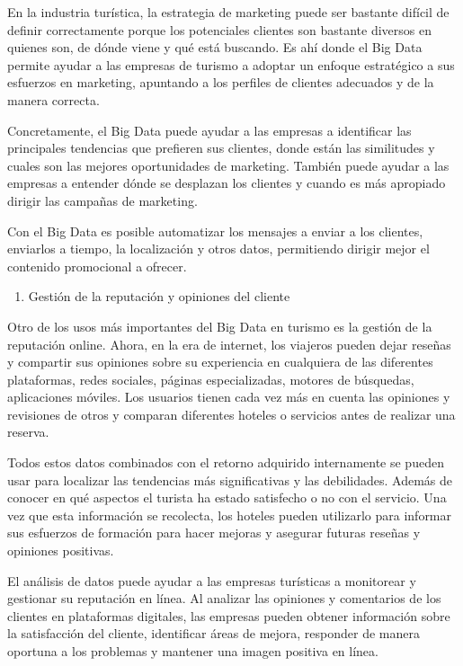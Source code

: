 \documentclass[
  letterpaper,
  DIV=11,
  numbers=noendperiod]{scrreprt}
\providecommand{\tightlist}{%
  \setlength{\itemsep}{0pt}\setlength{\parskip}{0pt}}\usepackage{longtable,booktabs,array}
\begin{document}
En la industria turística, la estrategia de marketing puede ser bastante
difícil de definir correctamente porque los potenciales clientes son
bastante diversos en quienes son, de dónde viene y qué está buscando. Es
ahí donde el Big Data permite ayudar a las empresas de turismo a adoptar
un enfoque estratégico a sus esfuerzos en marketing, apuntando a los
perfiles de clientes adecuados y de la manera correcta.

Concretamente, el Big Data puede ayudar a las empresas a identificar las
principales tendencias que prefieren sus clientes, donde están las
similitudes y cuales son las mejores oportunidades de marketing. También
puede ayudar a las empresas a entender dónde se desplazan los clientes y
cuando es más apropiado dirigir las campañas de marketing.

Con el Big Data es posible automatizar los mensajes a enviar a los
clientes, enviarlos a tiempo, la localización y otros datos, permitiendo
dirigir mejor el contenido promocional a ofrecer.

\begin{enumerate}
\def\labelenumi{\arabic{enumi}.}
\setcounter{enumi}{5}
\tightlist
\item
  Gestión de la reputación y opiniones del cliente
\end{enumerate}

Otro de los usos más importantes del Big Data en turismo es la gestión
de la reputación online. Ahora, en la era de internet, los viajeros
pueden dejar reseñas y compartir sus opiniones sobre su experiencia en
cualquiera de las diferentes plataformas, redes sociales, páginas
especializadas, motores de búsquedas, aplicaciones móviles. Los usuarios
tienen cada vez más en cuenta las opiniones y revisiones de otros y
comparan diferentes hoteles o servicios antes de realizar una reserva.

Todos estos datos combinados con el retorno adquirido internamente se
pueden usar para localizar las tendencias más significativas y las
debilidades. Además de conocer en qué aspectos el turista ha estado
satisfecho o no con el servicio. Una vez que esta información se
recolecta, los hoteles pueden utilizarlo para informar sus esfuerzos de
formación para hacer mejoras y asegurar futuras reseñas y opiniones
positivas.

El análisis de datos puede ayudar a las empresas turísticas a monitorear
y gestionar su reputación en línea. Al analizar las opiniones y
comentarios de los clientes en plataformas digitales, las empresas
pueden obtener información sobre la satisfacción del cliente,
identificar áreas de mejora, responder de manera oportuna a los
problemas y mantener una imagen positiva en línea.
\end{document}

